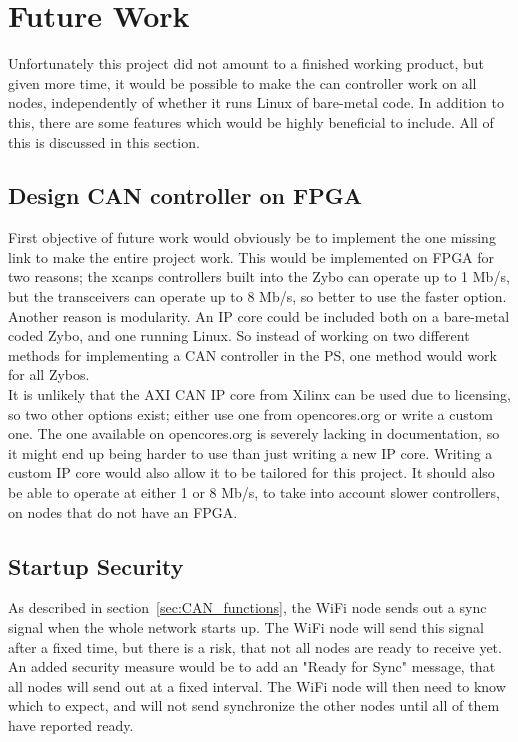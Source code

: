 
\section{Future Work}\label{sec:future_work}
Unfortunately this project did not amount to a finished working product, but given more time, it would be possible to make the can controller work on all nodes, independently of whether it runs Linux of bare-metal code.
In addition to this, there are some features which would be  highly beneficial to include.
All of this is discussed in this section.

\subsection*{Design CAN controller on FPGA}
First objective of future work would obviously be to implement the one missing link to make the entire project work.
This would be implemented on FPGA for two reasons;
the xcanps controllers built into the Zybo can operate up to 1 Mb/s, but the transceivers can operate up to 8 Mb/s, so better to use the faster option.
Another reason is modularity.
An IP core could be included both on a bare-metal coded Zybo, and one running Linux.
So instead of working on two different methods for implementing a CAN controller in the PS, one method would work for all Zybos.\\
It is unlikely that the AXI CAN IP core from Xilinx can be used due to licensing, so two other options exist; either use one from opencores.org or write a custom one.
The one available on opencores.org is severely lacking in documentation, so it might end up being harder to use than just writing a new IP core.
Writing a custom IP core would also allow it to be tailored for this project. 
It should also be able to operate at either 1 or 8 Mb/s, to take into account slower controllers, on nodes that do not have an FPGA.

\subsection*{Startup Security}
As described in section~\ref{sec:CAN_functions}, the WiFi node sends out a sync signal when the whole network starts up.
The WiFi node will send this signal after a fixed time, but there is a risk, that not all nodes are ready to receive yet. 
An added security measure would be to add an "Ready for Sync" message, that all nodes will send out at a fixed interval.
The WiFi node will then need to know which to expect, and will not send synchronize the other nodes until all of them have reported ready.

